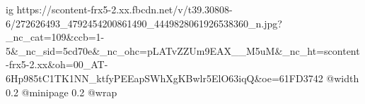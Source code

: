  
 
 
 
 

\ifcmt
  ig https://scontent-frx5-2.xx.fbcdn.net/v/t39.30808-6/272626493_4792454200861490_4449828061926538360_n.jpg?_nc_cat=109&ccb=1-5&_nc_sid=5cd70e&_nc_ohc=pLATvZZUm9EAX__M5uM&_nc_ht=scontent-frx5-2.xx&oh=00_AT-6Hp985tC1TK1NN_ktfyPEEapSWhXgKBwlr5ElO63iqQ&oe=61FD3742
  @width 0.2
  @minipage 0.2
  @wrap \parpic[l]
\fi
